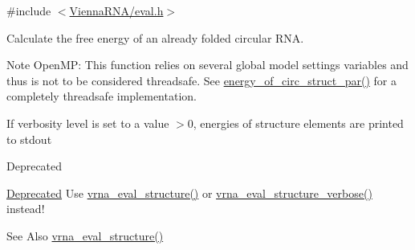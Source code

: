 {\ttfamily \#include $<$\hyperlink{eval_8h}{Vienna\-R\-N\-A/eval.\-h}$>$}



Calculate the free energy of an already folded circular R\-N\-A. 

\begin{DoxyNote}{Note}
Open\-M\-P\-: This function relies on several global model settings variables and thus is not to be considered threadsafe. See \hyperlink{group__eval_ga3f01f9744ba6a40555eb4d81fc77f6df}{energy\-\_\-of\-\_\-circ\-\_\-struct\-\_\-par()} for a completely threadsafe implementation.
\end{DoxyNote}
If verbosity level is set to a value $>$0, energies of structure elements are printed to stdout

\begin{DoxyRefDesc}{Deprecated}
\item[\hyperlink{deprecated__deprecated000051}{Deprecated}]Use \hyperlink{group__eval_ga58f199f1438d794a265f3b27fc8ea631}{vrna\-\_\-eval\-\_\-structure()} or \hyperlink{group__eval_ga0928d699d310178f84ee2351034e5cb5}{vrna\-\_\-eval\-\_\-structure\-\_\-verbose()} instead!\end{DoxyRefDesc}


\begin{DoxySeeAlso}{See Also}
\hyperlink{group__eval_ga58f199f1438d794a265f3b27fc8ea631}{vrna\-\_\-eval\-\_\-structure()}
\end{DoxySeeAlso}

